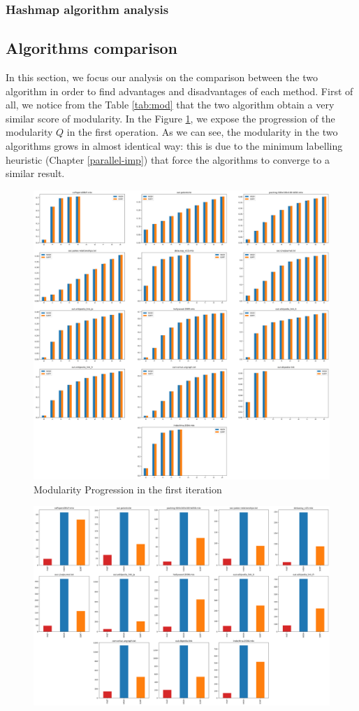 \subsubsection{Hashmap algorithm analysis}

\newpage
\subsection{Algorithms comparison}
In this section, we focus our analysis on the comparison between the two algorithm in order to find advantages and disadvantages of each method. 
First of all, we notice from the Table \ref{tab:mod} that the two algorithm obtain a very similar score of modularity. In the Figure \ref{fig:modularity-progression}, we expose the progression of the modularity $Q$ in the first operation. As we can see, the modularity in the two algorithms grows in almost identical way: this is due to the minimum labelling heuristic (Chapter \ref{parallel-imp}) that force the algorithms to converge to a similar result. 
\begin{figure}
	\centering
	\includegraphics[width=1\linewidth]{0-resources/modularity-progression}
	\caption{Modularity Progression in the first iteration}
	\label{fig:modularity-progression}
\end{figure} 
\begin{figure}[h]
	\centering
	\includegraphics[width=0.7\linewidth]{0-resources/first-hash-sort}
	\caption{}
	\label{fig:first-hash-sort}
\end{figure}
